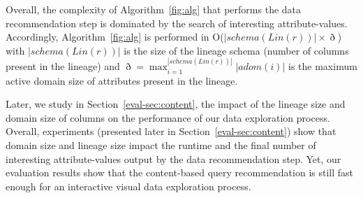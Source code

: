 Overall, the complexity of Algorithm~\ref{fig:alg} that performs the data recommendation step is dominated by the search of interesting attribute-values. Accordingly, Algorithm~\ref{fig:alg} is performed in O($|schema(Lin(r))| \times \eth$)  with $|schema(Lin(r))|$ is the size of the lineage schema (number of columns present in the lineage) and $\eth=\max_{i=1}^{|schema(Lin(r))|} |adom(i)|$ is the maximum active domain size of attributes present in the lineage.

Later, we study in Section~\ref{eval-sec:content}, the impact of the lineage size and domain size of columns on the performance of our data exploration process.
Overall, experiments (presented later in Section~\ref{eval-sec:content}) show that domain size and lineage size impact the runtime and the final number of interesting attribute-values output by the data recommendation step. Yet, our evaluation results show that the content-based query recommendation is still fast enough for an interactive visual data exploration process. 





